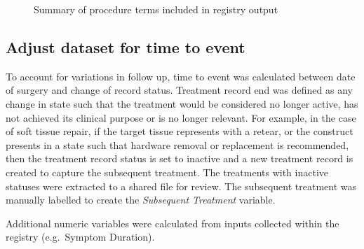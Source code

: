 \documentclass[
]{article}
\begin{document}
\begin{figure}[H]


\caption{\label{fig-ProcedureCount}Summary of procedure terms included
in registry output}

\end{figure}%

\subsection{Adjust dataset for time to
event}\label{adjust-dataset-for-time-to-event}

To account for variations in follow up, time to event was calculated
between date of surgery and change of record status. Treatment record
end was defined as any change in state such that the treatment would be
considered no longer active, has not achieved its clinical purpose or is
no longer relevant. For example, in the case of soft tissue repair, if
the target tissue represents with a retear, or the construct presents in
a state such that hardware removal or replacement is recommended, then
the treatment record status is set to inactive and a new treatment
record is created to capture the subsequent treatment. The treatments
with inactive statuses were extracted to a shared file for review. The
subsequent treatment was manually labelled to create the
\emph{Subsequent Treatment} variable.

Additional numeric variables were calculated from inputs collected
within the registry (e.g.~Symptom Duration).
\end{document}
